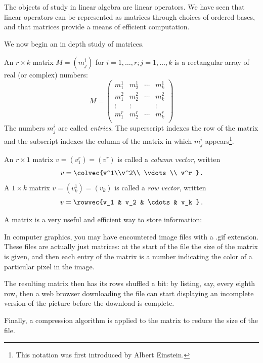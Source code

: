 \chapter{\propMatricesTitle} \label{properties_matrices}

The objects of study in linear algebra are linear operators. 
We have seen that linear operators can be represented as matrices through choices of ordered bases, and that matrices provide a means of efficient computation. 

We now begin an in depth study of matrices.

\begin{definition}
An $r\times k$ matrix $M=(m^i_j)$ for $i=1, \ldots, r; j=1, \ldots, k$ is a rectangular array of real (or complex) numbers:
\label{matrixnotation}
\[M = 
\begin{pmatrix}
m_1^1 & m_2^1 & \cdots & m_k^1 \\
m_1^2 & m_2^2 & \cdots & m_k^2 \\
\vdots & \vdots &   & \vdots \\
m_1^r & m_2^r & \cdots & m_k^r \\
\end{pmatrix}
\]
The numbers $m^i_j$ are called \emph{entries}.  The superscript indexes the row of the matrix and the subscript indexes the column of the matrix in which $m_j^i$ appears\footnote{This notation was first introduced by Albert Einstein.}.
\end{definition}


An $r\times 1$ matrix $v = (v^r_1) = (v^r)$ is called a \emph{column vector}, written \[v = \colvec{v^1\\v^2\\ \vdots \\ v^r }\, .\]  A $1\times k$ matrix $v = (v^1_k) = (v_k)$ is called a \emph{row vector}, written \[v = \rowvec{v_1 & v_2 & \cdots & v_k }\, .\]  


A matrix is a very useful and efficient way to store information:

\begin{example}
In computer graphics, you may have encountered image files with a .gif extension.  These files are actually just matrices: at the start of the file the size of the matrix is given, and then each entry of the matrix is a number indicating the color of a particular pixel in the image.

The resulting matrix  then has its rows shuffled a bit: by listing, say, every eighth row, then a web browser downloading the file can start displaying an incomplete version of the picture before the download is complete.

Finally, a compression algorithm is applied to the matrix to reduce the size of the file.
\end{example}

